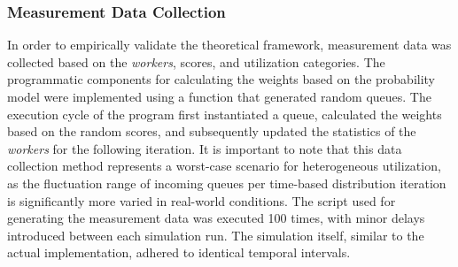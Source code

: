 \documentclass[twocolumn]{webofc}
\begin{document}
\subsubsection{Measurement Data Collection}
In order to empirically validate the theoretical framework, measurement data was collected based on the \textit{workers}, scores, and utilization categories. The programmatic components for calculating the weights based on the probability model were implemented using a function that generated random queues. The execution cycle of the program first instantiated a queue, calculated the weights based on the random scores, and subsequently updated the statistics of the \textit{workers} for the following iteration. It is important to note that this data collection method represents a worst-case scenario for heterogeneous utilization, as the fluctuation range of incoming queues per time-based distribution iteration is significantly more varied in real-world conditions. The script used for generating the measurement data was executed 100 times, with minor delays introduced between each simulation run. The simulation itself, similar to the actual implementation, adhered to identical temporal intervals. 
\end{document}
